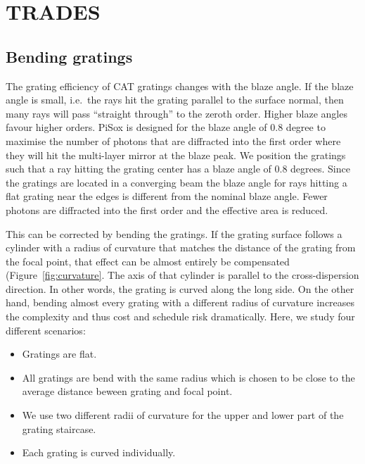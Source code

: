 \documentclass[]{spie}  %
\begin{document}
\section{TRADES}
\label{sect:trades}

\subsection{Bending gratings}
\label{sect:bend}
The grating efficiency of CAT gratings changes with the blaze
angle. If the blaze angle is small, i.e.\ the rays hit the grating
parallel to the surface normal, then many rays will pass ``straight
through'' to the zeroth order. Higher blaze angles favour higher
orders. PiSox is designed for the blaze angle of 0.8 degree to
maximise the number of photons that are diffracted into the first
order where they will hit the multi-layer mirror at the blaze peak. We
position the gratings such that a ray hitting the grating center has a
blaze angle of 0.8 degrees. Since the gratings are located in a
converging beam the blaze angle for rays hitting a flat grating near
the edges is different from the nominal blaze angle. Fewer photons are
diffracted into the first order and the effective area is reduced.

This can be corrected by bending the gratings. If the grating surface
follows a cylinder with a radius of curvature that matches the
distance of the grating from the focal point, that effect can be
almost entirely be compensated (Figure~\ref{fig:curvature}. The axis
of that cylinder is parallel to the cross-dispersion direction. In
other words, the grating is curved along the long side. On the other
hand, bending almost every grating with a different radius of
curvature increases the complexity and thus cost and schedule risk
dramatically. Here, we study four different scenarios:
\begin{itemize}
    \item Gratings are flat.
    \item All gratings are bend with the same radius which is chosen to be close to the average distance beween grating and focal point.
    \item We use two different radii of curvature for the upper and lower part of the grating staircase.
    \item Each grating is curved individually.
\end{itemize}
\end{document}
